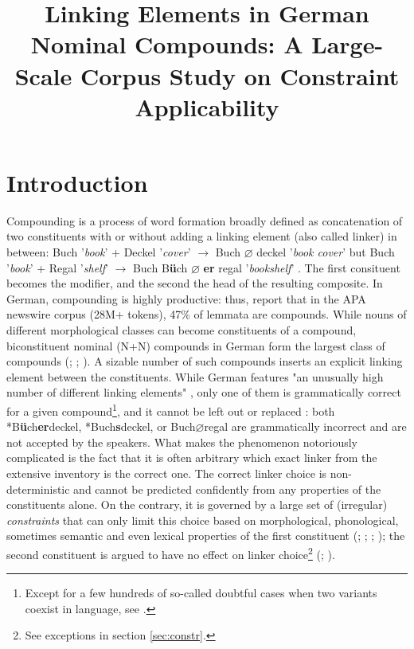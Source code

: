 \documentclass[10pt, a4paper]{article}
\title{Linking Elements in German Nominal Compounds: A Large-Scale Corpus Study on Constraint Applicability}
\newcommand{\zeroLinker}{\ensuremath{\boldsymbol{\varnothing}}}
\newcommand{\compEx}[7]{%
    #1 '\textit{#2}' + #4 '\textit{#5}'
    $\rightarrow$
    \if\relax\detokenize{#6}\relax
      #1%
    \else
      #6%
    \fi
    \if\relax\detokenize{#3}\relax
      \zeroLinker%
    \else
      \textbf{#3}%
    \fi
    \MakeLowercase{#4} '\textit{#7}'%
}
\begin{document}
\maketitleabstract



\section{Introduction}
\label{sec:intro}

Compounding is a process of word formation broadly defined as concatenation of two constituents with or without adding a linking element (also called linker) in between: \compEx{Buch}{book}{}{Deckel}{cover}{}{book cover} but \compEx{Buch}{book}{er}{Regal}{shelf}{B\textbf{ü}ch}{bookshelf}. The first consituent becomes the modifier, and the second the head of the resulting composite. In German, compounding is highly productive: thus, \citet{baroni_etal_2003} report that in the APA newswire corpus (28M+ tokens), 47\% of lemmata are compounds. While nouns of different morphological classes can become constituents of a compound, biconstituent nominal (N+N) compounds in German form the largest class of compounds (\citealp[53]{ortner_mueller-bollhagen_1991}; \citealp{scherer_2012}; \citealp{schluecker_2023}). A sizable number of such compounds inserts an explicit linking element between the constituents. While German features "an unusually high number of different linking elements" \citep{schaefer_pankratz_2018}, only one of them is grammatically correct for a given compound\footnote{Except for a few hundreds of so-called doubtful cases when two variants coexist in language, see \citep{nuebling_szczepaniak_2013}.}, and it cannot be left out or replaced \citep{neef_borgwaldt_2012}: both *B\textbf{ü}ch\textbf{er}deckel, *Buch\textbf{s}deckel, or Buch{\zeroLinker}regal are grammatically incorrect and are not accepted by the speakers. What makes the phenomenon notoriously complicated is the fact that it is often arbitrary which exact linker from the extensive inventory is the correct one. The correct linker choice is non-deterministic and cannot be predicted confidently from any properties of the constituents alone. On the contrary, it is governed by a large set of (irregular) \textit{constraints} that can only limit this choice based on morphological, phonological, sometimes semantic and even lexical properties of the first constituent (\citealp[227]{eisenberg_2013}; \citealp{kuerschner_2005}; \citealp{libben_etal_2009}; \citealp{schaefer_pankratz_2018}); the second constituent is argued to have no effect on linker choice\footnote{See exceptions in section \ref{sec:constr}.} (\citealp{kuerschner_2005}; \citealp[56]{ortner_mueller-bollhagen_1991}).
\end{document}
